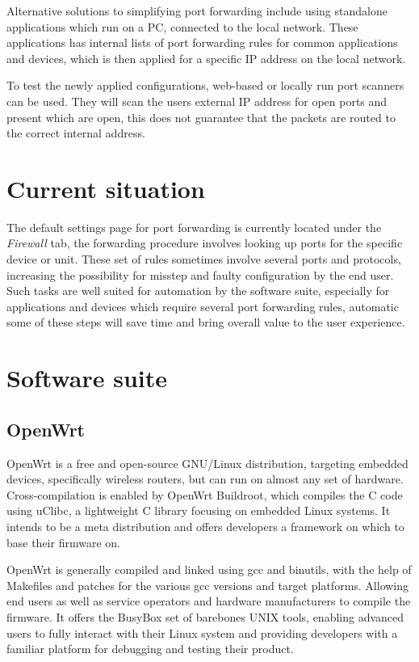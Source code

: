 \documentclass[a4paper,11pt]{kth-bcs}
\begin{document}
Alternative solutions to simplifying port forwarding include using standalone applications which run on a PC, connected to the local network.
These applications has internal lists of port forwarding rules for common applications and devices, which is then applied for a specific IP address on the local network.
\cite{portforward.com}

To test the newly applied configurations, web-based or locally run port scanners can be used.
They will scan the users external IP address for open ports and present which are open, this does not guarantee that the packets are routed to the correct internal address.

\section{Current situation}
The default settings page for port forwarding is currently located under the \emph{Firewall} tab, the forwarding procedure involves looking up ports for the specific device or unit.
These set of rules sometimes involve several ports and protocols, increasing the possibility for misstep and faulty configuration by the end user.
Such tasks are well suited for automation by the software suite, especially for applications and devices which require several port forwarding rules, automatic some of these steps will save time and bring overall value to the user experience.

\section{Software suite}

\subsection{OpenWrt}
OpenWrt is a free and open-source GNU/Linux distribution, targeting embedded devices, specifically wireless routers, but can run on almost any set of hardware.
Cross-compilation is enabled by OpenWrt Buildroot, which compiles the C code using uClibc, a lightweight C library focusing on embedded Linux systems. 
It intends to be a meta distribution and offers developers a framework on which to base their firmware on.

OpenWrt is generally compiled and linked using gcc and binutils, with the help of Makefiles and patches for the various gcc versions and target platforms.
Allowing end users as well as service operators and hardware manufacturers to compile the firmware.
It offers the BusyBox set of barebones UNIX tools, enabling advanced users to fully interact with their Linux system and providing developers with a familiar platform for debugging and testing their product.
\cite{OpenWrt:structure_design}
\end{document}
